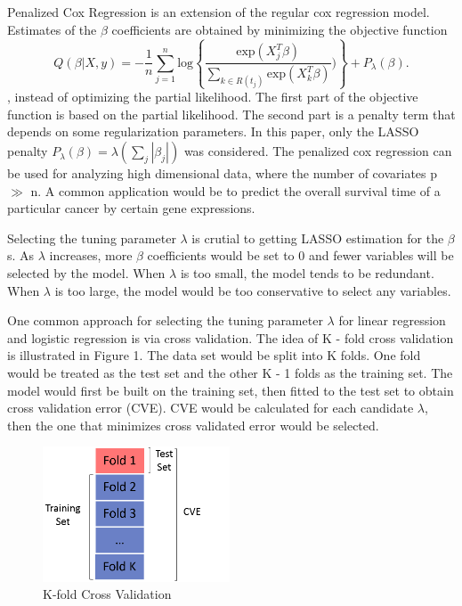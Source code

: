\documentclass{article}\usepackage[]{graphicx}\usepackage[]{color}
\begin{document}
Penalized Cox Regression is an extension of the regular cox regression model. Estimates of the $\beta$ coefficients are obtained by minimizing the objective function \begin{equation}  Q(\beta |X, y) = - \frac{1}{n}  \sum_{j=1}^{n} \text{log} \left \{\frac{\text{exp} ( X_{j}^{T} \beta)}{\sum_{ k \in R(t_{j})}\text{exp} ( X_{k}^{T} \beta)}) \right \} + P_{\lambda}(\beta). \end{equation}, instead of optimizing the partial likelihood. The first part of the objective function is based on the partial likelihood. The second part is a penalty term that depends on some regularization parameters. In this paper, only the LASSO penalty $P_{\lambda}(\beta) = \lambda (\sum_{j} |\beta_{j}|)$ was considered. The penalized cox regression can be used for analyzing high dimensional data, where the number of covariates p $\gg$ n. A common application would be to predict the overall survival time of a particular cancer by certain gene expressions.

Selecting the tuning parameter $\lambda$ is crutial to getting LASSO estimation for the $\beta$s. As $\lambda$ increases, more $\beta$ coefficients would be set to 0 and fewer variables will be selected by the model. When $\lambda$ is too small, the model tends to be redundant. When $\lambda$ is too large, the model would be too conservative to select any variables.

One common approach for selecting the tuning parameter $\lambda$ for linear regression and logistic regression is via cross validation. The idea of K - fold cross validation is illustrated in Figure 1. The data set would be split into K folds. One fold would be treated as the test set and the other K - 1 folds as the training set. The model would first be built on the training set, then fitted to the test set to obtain cross validation error (CVE).  CVE would be calculated for each candidate $\lambda$, then the one that minimizes cross validated error would be selected.

\begin{figure}
    \centering
		\includegraphics[height= 4cm ]{./figures/cv.png}	
    \caption{K-fold Cross Validation}
\end{figure}	
\end{document}
